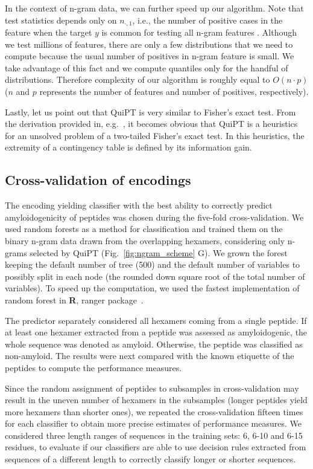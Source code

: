 \documentclass[fleqn,10pt,twoside]{gcb15submission}
\begin{document}
  In the context of n-gram data, we can further speed up our algorithm. Note 
that test statistics depends only on $n_{\cdot, 1}$, i.e., the number of 
positive cases in the feature when the target $y$ is common for testing all 
n-gram features . Although we test millions of features, there are only a few 
distributions that we need to compute because the usual number of positives in 
n-gram feature is small. We take advantage of this fact and we compute quantiles 
only for the handful of distributions. Therefore complexity of our algorithm is 
roughly equal to $O(n\cdot p)$ ($n$ and $p$ represents the number of features and 
number of positives, respectively).

  Lastly, let us point out that QuiPT is very similar to Fisher's exact test. 
From the derivation provided in, e.g.~\citep{lehmann_testing_2008}, it becomes 
obvious that QuiPT is a heuristics for an unsolved problem of a two-tailed 
Fisher's exact test. In this heuristics, the extremity of a contingency table is 
defined by its information gain.


\subsection{Cross-validation of encodings}

The encoding yielding classifier with the best ability to correctly predict 
amyloidogenicity of peptides was chosen during the five-fold cross-validation.
We used random forests as a method for classification and trained them on the binary 
n-gram data drawn from the overlapping hexamers, considering only n-grams selected by 
QuiPT (Fig.~\ref{fig:ngram_scheme} G). We grown the forest keeping the default number
of tree (500) and the default number of variables to possibly split in each node 
(the rounded down square root of the total number of variables). To speed up the 
computation, we used the fastest implementation of random forest in \textbf{R}, 
ranger package~\citep{wright_ranger:_2015}.

  The predictor separately considered all hexamers coming from a single peptide. 
If at least one hexamer extracted from a peptide was assessed as amyloidogenic, 
the whole sequence was denoted as amyloid. Otherwise, the peptide was classified 
as non-amyloid. The results were next compared with the known etiquette of the 
peptides to compute the performance measures.

  Since the random assignment of peptides to subsamples in cross-validation may 
result in the uneven number of hexamers in the subsamples (longer peptides yield 
more hexamers than shorter ones), we repeated the cross-validation fifteen times 
for each classifier to obtain more precise estimates of performance measures. We 
considered three length ranges of sequences in the training sets: 6, 6-10 and 
6-15 residues, to evaluate if our classifiers are able to use decision rules 
extracted from sequences of a different length to correctly classify longer or 
shorter sequences. 
\end{document}
